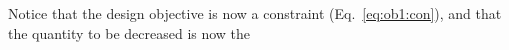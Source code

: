 \documentclass[letterpaper,10pt]{article}
\begin{document}
Notice that the design objective is now a constraint (Eq.~\ref{eq:ob1:con}),
and that the quantity to be decreased is now the 


% 
% 
% 
% 
% 
% 
% 
\end{document}
